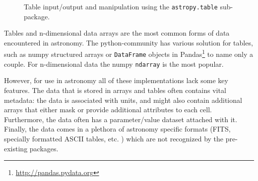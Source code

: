 \documentclass[traditabstract]{aa}
\begin{document}
\begin{figure}
\center
\caption{Table input/output and manipulation using the \texttt{astropy.table}
sub-package.\label{code:tables}}
\vspace{0.1in}
\end{figure}

Tables and n-dimensional data arrays are the most common forms of data
encountered in astronomy. The \gls{python}-community has various solution for
tables, such as \gls{numpy} structured arrays or \texttt{DataFrame} objects in
Pandas\footnote{\url{http://pandas.pydata.org}} to name only a couple. For
n-dimensional data the \gls{numpy} \texttt{ndarray} is the most popular.

However, for use in astronomy all of these implementations lack some key
features. The data that is stored in arrays and tables often contains vital
metadata: the data is associated with units, and might also contain additional
arrays that either mask or provide additional attributes to each cell.
Furthermore, the data often has a parameter/value dataset attached with it.
Finally, the data comes in a plethora of astronomy specific formats (FITS,
specially formatted ASCII tables, etc. ) which are not recognized by the
pre-existing packages.
\end{document}
